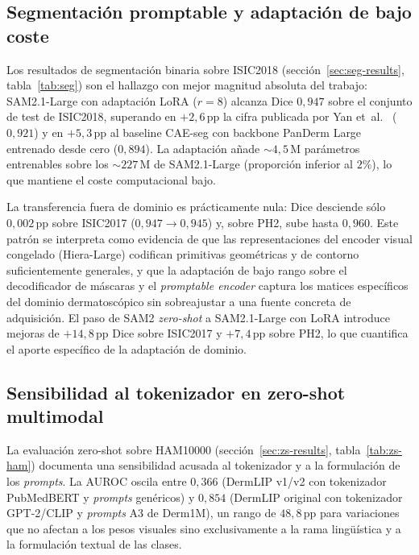 \subsection{Segmentación promptable y adaptación de bajo coste}
\label{sec:disc-segmentacion}

Los resultados de segmentación binaria sobre ISIC2018
(secci\'on~\ref{sec:seg-results}, tabla~\ref{tab:seg}) son el hallazgo
con mejor magnitud absoluta del trabajo: SAM2.1-Large con
adaptación LoRA ($r=8$) alcanza Dice $0{,}947$ sobre el conjunto
de test de ISIC2018, superando en $+2{,}6$\,pp la cifra
publicada por Yan et~al.~\cite{panderm2025} ($0{,}921$) y en
$+5{,}3$\,pp al baseline CAE-seg con backbone PanDerm Large
entrenado desde cero ($0{,}894$). La adaptación añade
$\sim 4{,}5$\,M parámetros entrenables sobre los
$\sim 227$\,M de SAM2.1-Large (proporción inferior al $2\%$),
lo que mantiene el coste computacional bajo.

La transferencia fuera de dominio es prácticamente nula: Dice
desciende sólo $0{,}002$\,pp sobre ISIC2017
($0{,}947 \to 0{,}945$) y, sobre PH2, sube hasta $0{,}960$.
Este patrón se interpreta como evidencia de que las
representaciones del encoder visual congelado (Hiera-Large)
codifican primitivas geométricas y de contorno
suficientemente generales, y que la adaptación de bajo rango sobre
el decodificador de máscaras y el \emph{promptable encoder}
captura los matices específicos del dominio dermatoscópico sin
sobreajustar a una fuente concreta de adquisición. El paso de SAM2
\emph{zero-shot} a SAM2.1-Large con LoRA introduce mejoras de
$+14{,}8$\,pp Dice sobre ISIC2017 y $+7{,}4$\,pp sobre PH2,
lo que cuantifica el aporte específico de la adaptación de
dominio.

\subsection{Sensibilidad al tokenizador en zero-shot multimodal}
\label{sec:disc-zs}

La evaluación zero-shot sobre HAM10000 (secci\'on~\ref{sec:zs-results},
tabla~\ref{tab:zs-ham}) documenta una sensibilidad acusada al
tokenizador y a la formulación de los \emph{prompts}. La AUROC
oscila entre $0{,}366$ (DermLIP v1/v2 con tokenizador PubMedBERT
y \emph{prompts} genéricos) y $0{,}854$ (DermLIP original con
tokenizador GPT-2/CLIP y \emph{prompts} A3 de Derm1M), un rango de
$48{,}8$\,pp para variaciones que no afectan a los pesos
visuales sino exclusivamente a la rama lingüística y a la
formulación textual de las clases.

